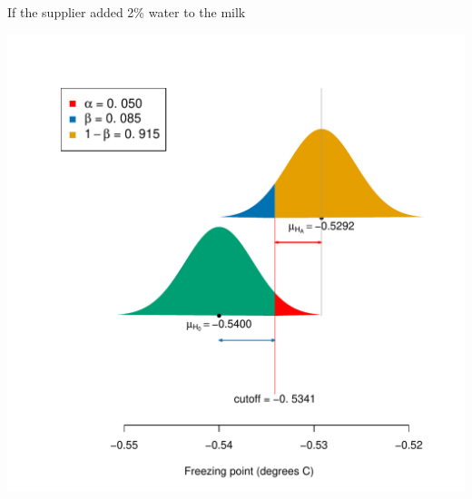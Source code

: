 \documentclass[10pt]{beamer}\usepackage[]{graphicx}\usepackage[]{color}
\makeatletter
\def\maxwidth{ %
  \ifdim\Gin@nat@width>\linewidth
    \linewidth
  \else
    \Gin@nat@width
  \fi
}
\newenvironment{knitrout}{}{} %
\makeatother
\begin{document}
\begin{frame}[fragile]{If the supplier added 2\% water to the milk}
\begin{knitrout}\tiny
{}\color{fgcolor}

{\centering \includegraphics[width=\maxwidth]{figure/unnamed-chunk-9-1} 

}


\end{knitrout}
\end{frame}
\end{document}

